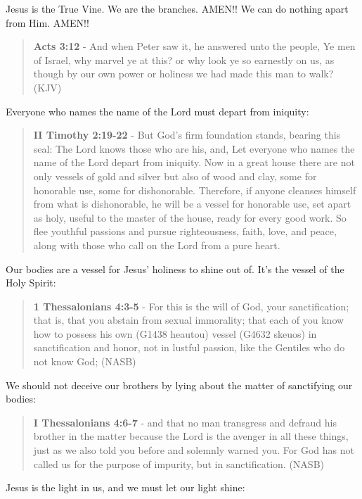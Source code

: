 \documentclass[11pt]{article}
\begin{document}
Jesus is the True Vine. We are the branches. AMEN!! We can do nothing apart from Him. AMEN!!

\begin{quote}
\textbf{Acts 3:12} - And when Peter saw it, he answered unto the people, Ye men of Israel, why marvel ye at this? or why look ye so earnestly on us, as though by our own power or holiness we had made this man to walk? (KJV)
\end{quote}

Everyone who names the name of the Lord must depart from iniquity:

\begin{quote}
\textbf{II Timothy 2:19-22} - But God's firm foundation stands, bearing this seal: The Lord knows those who are his, and, Let everyone who names the name of the Lord depart from iniquity. Now in a great house there are not only vessels of gold and silver but also of wood and clay, some for honorable use, some for dishonorable. Therefore, if anyone cleanses himself from what is dishonorable, he will be a vessel for honorable use, set apart as holy, useful to the master of the house, ready for every good work. So flee youthful passions and pursue righteousness, faith, love, and peace, along with those who call on the Lord from a pure heart.
\end{quote}

Our bodies are a vessel for Jesus' holiness to shine out of. It's the vessel of the Holy Spirit:

\begin{quote}
\textbf{1 Thessalonians 4:3-5} - For this is the will of God, your sanctification; that is, that you abstain from sexual immorality; that each of you know how to possess his own (G1438 heautou) vessel (G4632 skeuos) in sanctification and honor, not in lustful passion, like the Gentiles who do not know God; (NASB)
\end{quote}

We should not deceive our brothers by lying about the matter of sanctifying our bodies:

\begin{quote}
\textbf{I Thessalonians 4:6-7} - and that no man transgress and defraud his brother in the matter because the Lord is the avenger in all these things, just as we also told you before and solemnly warned you. For God has not called us for the purpose of impurity, but in sanctification. (NASB)
\end{quote}

Jesus is the light in us, and we must let our light shine:
\end{document}
